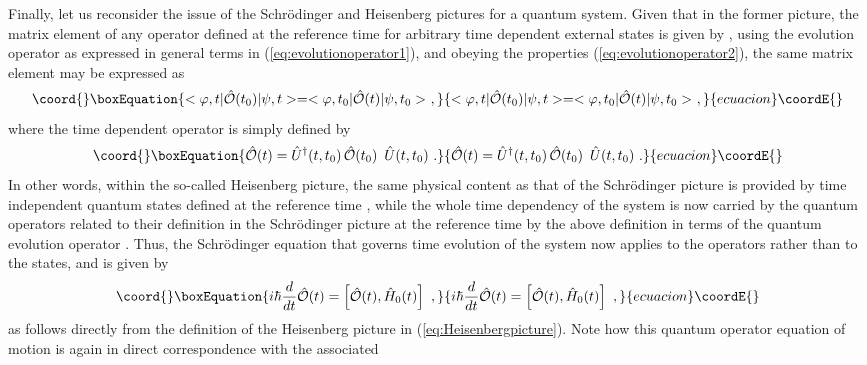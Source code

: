\documentclass[a4paper,11pt]{article}
\begin{document}
Finally, let us reconsider the issue of the Schr\"odinger and Heisenberg
pictures for a quantum system. Given that in the former picture, the
matrix element of any operator \coordHE{} defined at the
reference time \coordHE{} for arbitrary time dependent external states is
given by \coordHE{},
using the evolution operator as expressed in general terms in
(\ref{eq:evolutionoperator1}), and obeying the properties 
(\ref{eq:evolutionoperator2}), the same matrix element may be expressed as
\begin{equation}\coord{}\boxEquation{
<\varphi,t|\hat{\cal O}(t_0)|\psi,t>=<\varphi,t_0|\hat{\cal O}(t)|\psi,t_0>\ ,
}{
<\varphi,t|\hat{\cal O}(t_0)|\psi,t>=<\varphi,t_0|\hat{\cal O}(t)|\psi,t_0>\ ,
}{ecuacion}\coordE{}\end{equation}
where the time dependent operator \coordHE{} is simply defined by
\begin{equation}\coord{}\boxEquation{
\hat{\cal O}(t)=\hat{U}^\dagger(t,t_0)\,\hat{\cal O}(t_0)\,\
\hat{U}(t,t_0)\ .
\label{eq:Heisenbergpicture}
}{
\hat{\cal O}(t)=\hat{U}^\dagger(t,t_0)\,\hat{\cal O}(t_0)\,\
\hat{U}(t,t_0)\ .
}{ecuacion}\coordE{}\end{equation}
In other words, within the so-called Heisenberg picture, the same physical
content as that of the Schr\"odinger picture is provided by time independent
quantum states \myHighlight{$|\psi,t_0>$}\coordHE{} defined at the reference time \coordHE{}, while
the whole time dependency of the system is now carried by the quantum
operators \myHighlight{${\cal O}(t)$}\coordHE{} related to their definition in the Schr\"odinger
picture at the reference time \myHighlight{$t_0$}\coordHE{} by the above definition in terms
of the quantum evolution operator \myHighlight{$\hat{U}(t_2,t_1)$}\coordHE{}. Thus, the Schr\"odinger
equation that governs time evolution of the system now applies to the
operators rather than to the states, and is given by 
\begin{equation}\coord{}\boxEquation{
i\hbar\frac{d}{dt}\hat{\cal O}(t)=\left[\hat{\cal O}(t),\hat{H}_0(t)\right]\ ,
}{
i\hbar\frac{d}{dt}\hat{\cal O}(t)=\left[\hat{\cal O}(t),\hat{H}_0(t)\right]\ ,
}{ecuacion}\coordE{}\end{equation}
as follows directly from the definition of the Heisenberg
picture in (\ref{eq:Heisenbergpicture}). Note how this quantum operator 
equation of motion is again in direct correspondence with the associated
\end{document}
